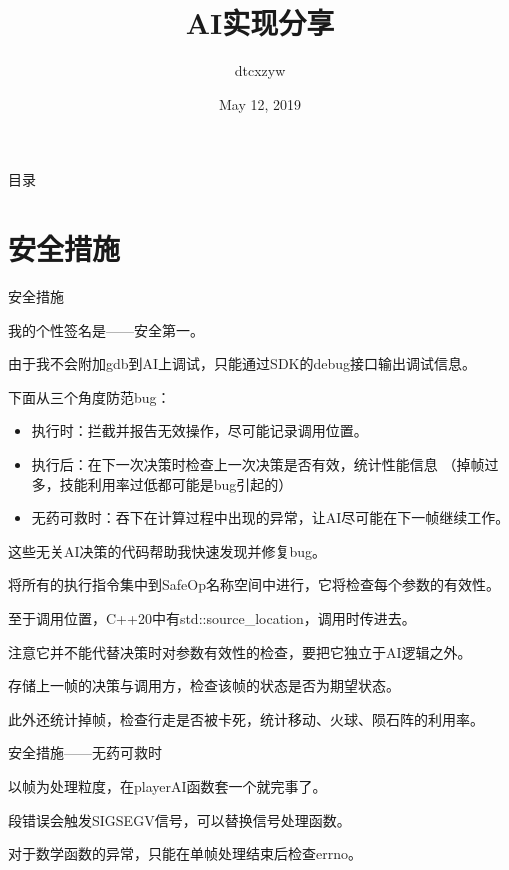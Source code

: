 \documentclass[aspectratio=43,compress]{beamer}
\title{AI实现分享}
\date{May 12, 2019}
\author[dtcxzyw]{dtcxzyw}
\begin{document}
\begin{frame}
\titlepage
\end{frame}

\begin{frame}{目录}
\begin{card}
\tableofcontents
\end{card}
\end{frame}

\section{安全措施}
\begin{frame}{安全措施}
\begin{card}
我的个性签名是——安全第一。

由于我不会附加gdb到AI上调试，只能通过SDK的debug接口输出调试信息。

下面从三个角度防范bug：
\begin{itemize}
    \item 执行时：拦截并报告无效操作，尽可能记录调用位置。
    \item 执行后：在下一次决策时检查上一次决策是否有效，统计性能信息
    （掉帧过多，技能利用率过低都可能是bug引起的）
    \item 无药可救时：吞下在计算过程中出现的异常，让AI尽可能在下一帧继续工作。
\end{itemize}

这些无关AI决策的代码帮助我快速发现并修复bug。
\end{card}
\end{frame}

\begin{frame}
\begin{card}
将所有的执行指令集中到SafeOp名称空间中进行，它将检查每个参数的有效性。

至于调用位置，C++20中有std::source\_location，调用时传进去。

注意它并不能代替决策时对参数有效性的检查，要把它独立于AI逻辑之外。
\end{card}
\begin{card}
存储上一帧的决策与调用方，检查该帧的状态是否为期望状态。

此外还统计掉帧，检查行走是否被卡死，统计移动、火球、陨石阵的利用率。
\end{card}
\end{frame}

\begin{frame}{安全措施——无药可救时}
\begin{card}[C++ Exception]
以帧为处理粒度，在playerAI函数套一个就完事了。
\end{card}
\begin{card}[signal]
段错误会触发SIGSEGV信号，可以替换信号处理函数。
\end{card}
\begin{card}[errno]
对于数学函数的异常，只能在单帧处理结束后检查errno。
\end{card}
\end{frame}
\end{document}
